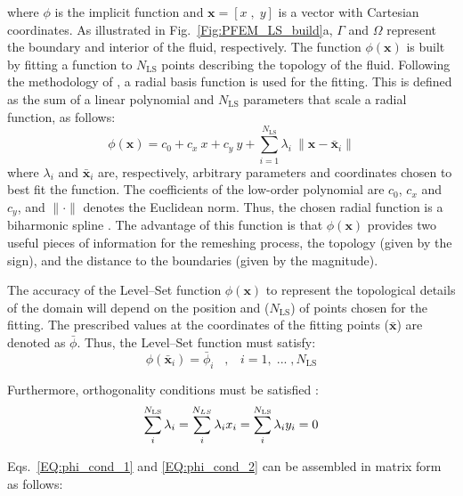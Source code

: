 \documentclass[final,3p,times]{elsarticle}
\newcommand{\EF}[1]{{\color{black}{#1}}}
\begin{document}
\noindent where $\phi$ is the implicit function and $\mathbf{x}=[x\;,\;y]$ is a vector with Cartesian coordinates. As illustrated in Fig.~\ref{Fig:PFEM_LS_build}a, $\Gamma$ and $\Omega$ represent the boundary and interior of the fluid, respectively. The function $\phi(\mathbf{x})$ is built by fitting a function to $N_\mathrm{LS}$ points describing the topology of the fluid. Following the methodology of \citep{carr2001reconstruction,belytschko2003structured}, a radial basis function is used for the fitting. This is defined as the sum of a linear polynomial and $N_\mathrm{LS}$ parameters that scale a radial function, as follows:
%
\begin{equation}
\phi(\mathbf{x}) = c_0 + c_x\:x + c_y\:y + \displaystyle\sum_{i=1}^{N_\mathrm{LS}} \lambda_i \: \| \mathbf{x} - \bar{\mathbf{x}}_i\|
\end{equation}
%
\noindent where $\lambda_i$ and $\bar{\mathbf{x}}_i$ are, respectively, arbitrary parameters and coordinates chosen to best fit the function. The coefficients of the low-order polynomial are $c_0$, $c_x$ and $c_y$, and $\| \cdot \|$ denotes the Euclidean norm. Thus, the chosen radial function is a biharmonic spline \citep{carr2001reconstruction}. The advantage of this function is that $\phi(\mathbf{x})$ provides two useful pieces of information for the remeshing process, the topology (given by the sign), and the distance to the boundaries (given by the magnitude). 

The accuracy of the Level--Set function $\phi(\mathbf{x})$ to represent the topological details of the domain will depend on the position and \EF{amount} ($N_\mathrm{LS}$) of points chosen for the fitting. The prescribed values at the coordinates of the fitting points ($\bar{\mathbf{x}}$) are denoted as $\bar{\phi}$. Thus, the Level--Set function must satisfy:
%
\begin{equation}\label{EQ:phi_cond_1}
\phi(\bar{\mathbf{x}}_i) = \bar{\phi}_i \;\;\;,\;\;\; i=1,\;...\;,N_\mathrm{LS}
\end{equation}

Furthermore, orthogonality conditions must be satisfied \citep{carr2001reconstruction}:
%
\begin{equation}\label{EQ:phi_cond_2}
\displaystyle\sum_{i}^{\EF{N_\mathrm{LS}}} \lambda_i = 
\sum_{i}^{\EF{N_{LS}}} \lambda_i x_i
= 
\sum_{i}^{\EF{N_\mathrm{LS}}} \lambda_i y_i = 0
\end{equation}

Eqs.~\eqref{EQ:phi_cond_1} and \eqref{EQ:phi_cond_2} can be assembled in matrix form as follows:
\end{document}
